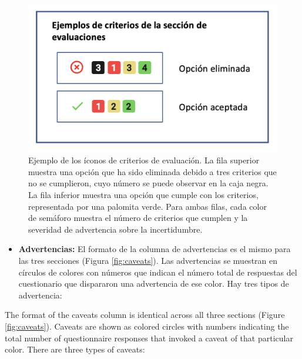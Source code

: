 \documentclass[
  11pt,
]{book}
\providecommand{\tightlist}{%
  \setlength{\itemsep}{0pt}\setlength{\parskip}{0pt}}
\begin{document}
\begin{figure}

{\centering \includegraphics[width=0.35\linewidth]{images/a-criteria-es} 

}

\caption{Ejemplo de los íconos de criterios de evaluación. La fila superior muestra una opción que ha sido eliminada debido a tres criterios que no se cumplieron, cuyo número se puede observar en la caja negra. La fila inferior muestra una opción que cumple con los criterios, representada por una palomita verde. Para ambas filas, cada color de semáforo muestra el número de criterios que cumplen y la severidad de advertencia sobre la incertidumbre.}\label{fig:a-criteria}
\end{figure}

\begin{itemize}
\tightlist
\item
  \textbf{Advertencias:} El formato de la columna de advertencias es el mismo para las tres secciones (Figura \ref{fig:caveats}). Las advertencias se muestran en círculos de colores con números que indican el número total de respuestas del cuestionario que dispararon una advertencia de ese color. Hay tres tipos de advertencia:
\end{itemize}

The format of the caveats column is identical across all three sections (Figure \ref{fig:caveats}). Caveats are shown as colored circles with numbers indicating the total number of questionnaire responses that invoked a caveat of that particular color. There are three types of caveats:
\end{document}
